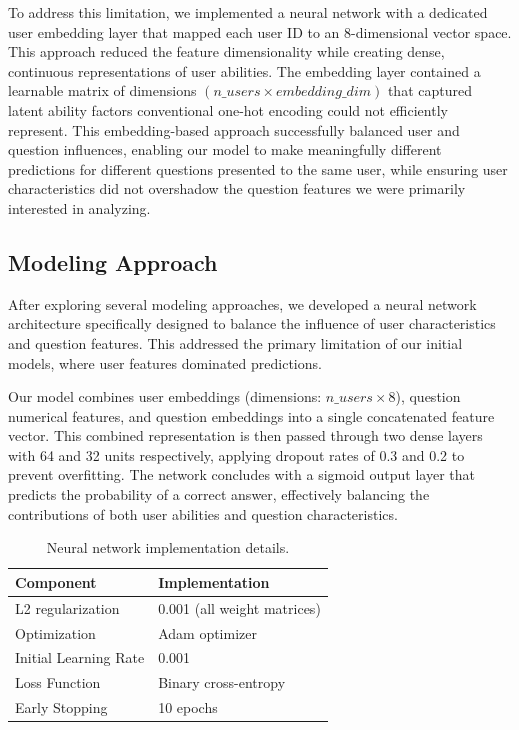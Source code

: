 \documentclass[
    a4paper, %
    10pt, %
    twoside, %
]{LTJournalArticle}
\begin{document}
To address this limitation, we implemented a neural network with a dedicated user embedding layer that mapped each user ID to an 8-dimensional vector space. This approach reduced the feature dimensionality while creating dense, continuous representations of user abilities. The embedding layer contained a learnable matrix of dimensions $(n\_users \times embedding\_dim)$ that captured latent ability factors conventional one-hot encoding could not efficiently represent. This embedding-based approach successfully balanced user and question influences, enabling our model to make meaningfully different predictions for different questions presented to the same user, while ensuring user characteristics did not overshadow the question features we were primarily interested in analyzing.

\subsection{Modeling Approach}

After exploring several modeling approaches, we developed a neural network architecture specifically designed to balance the influence of user characteristics and question features. This addressed the primary limitation of our initial models, where user features dominated predictions.

Our model combines user embeddings (dimensions: $n\_users \times 8$), question numerical features, and question embeddings into a single concatenated feature vector. This combined representation is then passed through two dense layers with 64 and 32 units respectively, applying dropout rates of 0.3 and 0.2 to prevent overfitting. The network concludes with a sigmoid output layer that predicts the probability of a correct answer, effectively balancing the contributions of both user abilities and question characteristics.

\begin{table}[H]
    \centering
    \begin{tabular}{ll}
        \hline
        \textbf{Component} & \textbf{Implementation} \\
        \hline
        L2 regularization & 0.001 (all weight matrices) \\
        Optimization & Adam optimizer \\
        Initial Learning Rate & 0.001 \\
        Loss Function & Binary cross-entropy  \\
        Early Stopping & 10 epochs \\
        \hline
    \end{tabular}
    \caption{Neural network implementation details.}
    \label{tab:model-details}
\end{table}
\end{document}
